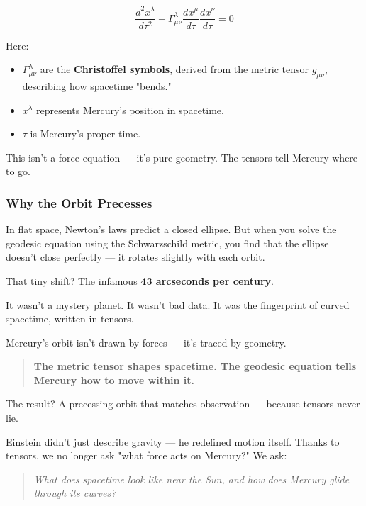 \[
\frac{d^2 x^\lambda}{d \tau^2} + \Gamma^\lambda_{\mu\nu} \frac{d x^\mu}{d \tau} \frac{d x^\nu}{d \tau} = 0
\]

Here:
\begin{itemize}
  \item \( \Gamma^\lambda_{\mu\nu} \) are the \textbf{Christoffel symbols}, derived from the metric tensor \( g_{\mu\nu} \), describing how spacetime "bends."
  \item \( x^\lambda \) represents Mercury’s position in spacetime.
  \item \( \tau \) is Mercury’s proper time.
\end{itemize}

This isn’t a force equation — it’s pure geometry. The tensors tell Mercury where to go.

\subsubsection*{Why the Orbit Precesses}

In flat space, Newton’s laws predict a closed ellipse. But when you solve the geodesic equation using the Schwarzschild metric, you find that the ellipse doesn’t close perfectly — it rotates slightly with each orbit.

That tiny shift? The infamous \textbf{43 arcseconds per century}.

It wasn’t a mystery planet. It wasn’t bad data.  
It was the fingerprint of curved spacetime, written in tensors.

\begin{tcolorbox}[colback=blue!5!white, colframe=blue!50!black, title={Tensors: The Hidden Architects of Motion}]
Mercury’s orbit isn’t drawn by forces — it’s traced by geometry.

\begin{quote}
\textbf{The metric tensor shapes spacetime.  
The geodesic equation tells Mercury how to move within it.}
\end{quote}

The result? A precessing orbit that matches observation — because tensors never lie.
\end{tcolorbox}

Einstein didn’t just describe gravity — he redefined motion itself. Thanks to tensors, we no longer ask "what force acts on Mercury?"  
We ask:

\begin{quote}
\textit{What does spacetime look like near the Sun, and how does Mercury glide through its curves?}
\end{quote}

